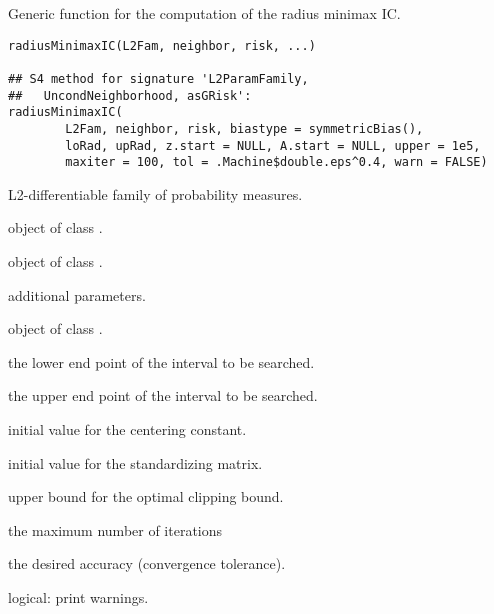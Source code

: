 \begin{Description}\relax
Generic function for the computation of the radius minimax IC.
\end{Description}
\begin{Usage}
\begin{verbatim}
radiusMinimaxIC(L2Fam, neighbor, risk, ...)

## S4 method for signature 'L2ParamFamily,
##   UncondNeighborhood, asGRisk':
radiusMinimaxIC(
        L2Fam, neighbor, risk, biastype = symmetricBias(),
        loRad, upRad, z.start = NULL, A.start = NULL, upper = 1e5, 
        maxiter = 100, tol = .Machine$double.eps^0.4, warn = FALSE)
\end{verbatim}
\end{Usage}
\begin{Arguments}
\begin{ldescription}
\item[\code{L2Fam}] L2-differentiable family of probability measures. 
\item[\code{neighbor}] object of class . 
\item[\code{risk}] object of class . 
\item[\code{...}] additional parameters. 
\item[\code{biastype}] object of class . 
\item[\code{loRad}] the lower end point of the interval to be searched. 
\item[\code{upRad}] the upper end point of the interval to be searched. 
\item[\code{z.start}] initial value for the centering constant. 
\item[\code{A.start}] initial value for the standardizing matrix. 
\item[\code{upper}] upper bound for the optimal clipping bound. 
\item[\code{maxiter}] the maximum number of iterations 
\item[\code{tol}] the desired accuracy (convergence tolerance).
\item[\code{warn}] logical: print warnings. 
\end{ldescription}
\end{Arguments}
